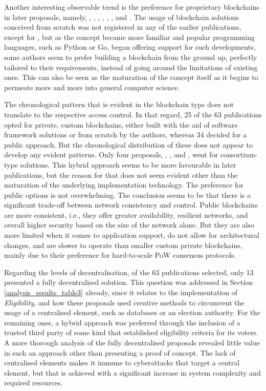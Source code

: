 \documentclass[../access.tex]{subfiles}
\begin{document}
	\par
    Another interesting observable trend is the preference for proprietary blockchains in later proposals, namely, \cite{Matile2019}, \cite{Faour2019}, \cite{Murtaza2019}, \cite{Yi2019}, \cite{Killer2020}, \cite{Han2020}, and \cite{Mani2022}. The usage of blockchain solutions conceived from scratch was not registered in any of the earlier publications, except for \cite{BenAyed2017}, but as the concept became more familiar and popular programming languages, such as Python or Go, began offering support for such developments, some authors seem to prefer building a blockchain from the ground up, perfectly tailored to their requirements, instead of going around the limitations of existing ones. This can also be seen as the maturation of the concept itself as it begins to permeate more and more into general computer science.
	\par
    The chronological pattern that is evident in the blockchain type does not translate to the respective access control. In that regard, 25 of the 63 publications opted for private, custom blockchains, either built with the aid of software framework solutions or from scratch by the authors, whereas 34 decided for a public approach. But the chronological distribution of these does not appear to develop any evident patterns. Only four proposals, \cite{Killer2020}, \cite{Han2020}, \cite{Hassan2022} and \cite{Mani2022}, went for consortium-type solutions. This hybrid approach seems to be more favourable in later publications, but the reason for that does not seem evident other than the maturation of the underlying implementation technology. The preference for public options is not overwhelming. The conclusion seems to be that there is a significant trade-off between network consistency and control. Public blockchains are more consistent, i.e., they offer greater availability, resilient networks, and overall higher security based on the size of the network alone. But they are also more limited when it comes to application support, do not allow for architectural changes, and are slower to operate than smaller custom private blockchains, mainly due to their preference for hard-to-scale PoW consensus protocols.
	\par
    Regarding the levels of decentralisation, of the 63 publications selected, only 13 presented a fully decentralised solution. This question was addressed in Section \ref{analysis_results_table3} already, since it relates to the implementation of \textit{Eligibility}, and how these proposals used creative methods to circumvent the usage of a centralised element, such as databases or an election authority. For the remaining ones, a hybrid approach was preferred through the inclusion of a trusted third party of some kind that established eligibility criteria for its voters. A more thorough analysis of the fully decentralised proposals revealed little value in such an approach other than presenting a proof of concept. The lack of centralised elements makes it immune to cyberattacks that target a central element, but that is achieved with a significant increase in system complexity and required resources.
\end{document}
